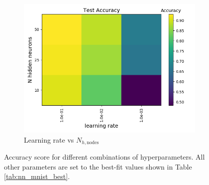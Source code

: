 \documentclass[a4paper]{article}
\newcommand{\Nhn}{N_{h,\text{nodes}}}
\begin{document}
\begin{figure}[H]
\begin{subfigure}{0.49\textwidth}
    \includegraphics[scale=0.45]{../figures/task_d/test/heatmap_test_lr_constant_Nhyp443431_Accuracy_eta0_nhn.png}
    \caption{Learning rate vs $\Nhn$}
  \end{subfigure}
  \caption{Accuracy score for different combinations of hyperparameters. All other parameters are set to the best-fit values shown in Table \ref{tab:nn_mnist_best}.}
  \label{fig:nn__mnist1}
\end{figure}
\end{document}
